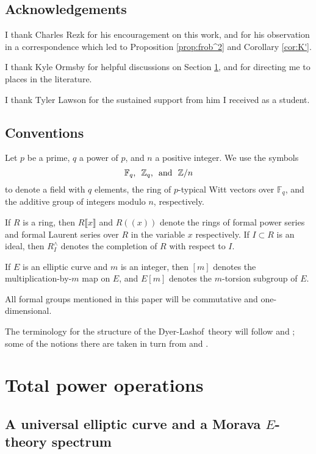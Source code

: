\documentclass{gtpart}
\theoremstyle{definition}
\theoremstyle{remark}
\newcommand{\mb}[1]{\mathbb{#1}}
\newcommand{\DL}{Dyer-Lashof~}
\newcommand{\BF}{{\mb F}}
\newcommand{\BZ}{{\mb Z}}
\newcommand{\ad}{{\rm and}}
\begin{document}
\subsection{Acknowledgements}

I thank Charles Rezk for his encouragement on this work, and for his observation in a correspondence which led to Proposition \ref{prop:frob^2} and Corollary \ref{cor:K'}.  

I thank Kyle Ormsby for helpful discussions on Section \ref{sec:total}, and for directing me to places in the literature.  

I thank Tyler Lawson for the sustained support from him I received as a student.  


\subsection{Conventions}

Let $p$ be a prime, $q$ a power of $p$, and $n$ a positive integer.  We use the symbols 
\[
 \BF_q\text{,}~~\BZ_q\text{,}~~\ad~~\BZ/n 
\]
to denote a field with $q$ elements, the ring of $p$-typical Witt vectors over $\BF_q$, 
and the additive group of integers modulo $n$, respectively.  

If $R$ is a ring, then $R\llbracket x \rrbracket$ and $R (\!(x)\!)$ denote the rings of formal power series and formal Laurent series over $R$ in the variable $x$ respectively.  
If $I \subset R$ is an ideal, then $R_I^\wedge$ denotes the completion of $R$ with respect to $I$.  

If $E$ is an elliptic curve and $m$ is an integer, then $[m]$ denotes the multiplication-by-$m$ map on $E$, and $E[m]$ denotes the $m$-torsion subgroup of $E$.  

All formal groups mentioned in this paper will be commutative and one-dimensional.  

The terminology for the structure of the \DL theory will follow \cite{cong} and \cite{h2p2}; 
some of the notions there are taken in turn from \cite{BW} and \cite{V}.  


\section{Total power operations}
\label{sec:total}

\subsection{A universal elliptic curve and a Morava $E$-theory spectrum}
\label{subsec:ec}
\end{document}
